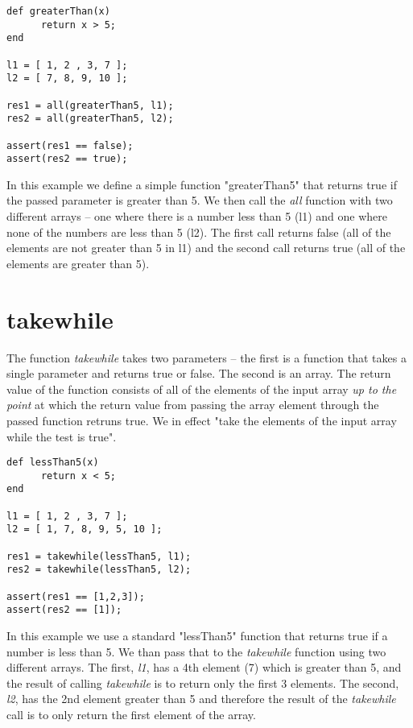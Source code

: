 \begin{lstlisting}[caption={Reflex all function}]
def greaterThan(x)
      return x > 5;
end

l1 = [ 1, 2 , 3, 7 ];
l2 = [ 7, 8, 9, 10 ];

res1 = all(greaterThan5, l1);
res2 = all(greaterThan5, l2);

assert(res1 == false);
assert(res2 == true);
\end{lstlisting}

In this example we define a simple function "greaterThan5" that returns true if the passed parameter is greater than 5. We then call the \emph{all} function with two different arrays -- one where there is a number less than 5 (l1) and one where none of the numbers are less than 5 (l2). The first call returns false (all of the elements are not greater than 5 in l1) and the second call returns true (all of the elements are greater than 5).

\section{takewhile}
The \Reflex function \emph{takewhile} takes two parameters -- the first is a function that takes a single parameter and returns true or false. The second is an array. The return value of the function consists of all of the elements of the input array \emph{up to the point} at which the return value from passing the array element through the passed function retruns true. We in effect "take the elements of the input array while the test is true".

\begin{lstlisting}[caption={Reflex takewhile example}]
def lessThan5(x)
      return x < 5;
end

l1 = [ 1, 2 , 3, 7 ];
l2 = [ 1, 7, 8, 9, 5, 10 ];

res1 = takewhile(lessThan5, l1);
res2 = takewhile(lessThan5, l2);

assert(res1 == [1,2,3]);
assert(res2 == [1]);
\end{lstlisting}

In this example we use a standard "lessThan5" function that returns true if a number is less than 5. We than pass that to the \emph{takewhile} function using two different arrays. The first, \emph{l1}, has a 4th element (7) which is greater than 5, and the result of calling \emph{takewhile} is to return only the first 3 elements. The second, \emph{l2}, has the 2nd element greater than 5 and therefore the result of the \emph{takewhile} call is to only return the first element of the array.


